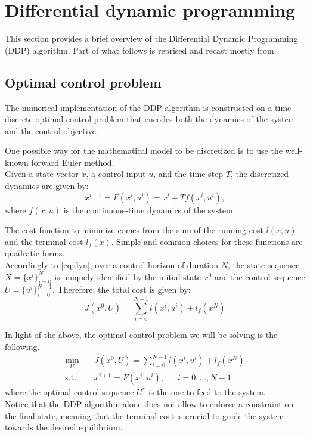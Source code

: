 \section{Differential dynamic programming}
This section provides a brief overview of the Differential Dynamic Programming (DDP) algorithm. Part of what follows is reprised and recast mostly from \cite{tassa07}.

\subsection{Optimal control problem}
The numerical implementation of the DDP algorithm is constructed on a time-discrete optimal control problem that encodes both the dynamics of the system and the control objective.

One possible way for the mathematical model to be discretized is to use the well-known forward Euler method. \\
Given a state vector $x$, a control input $u$, and the time step $T$, the discretized dynamics are given by:
\begin{equation}
    x^{i+1} = F(x^i, u^i) = x^i + T f(x^i, u^i), \label{eq:dyn}
\end{equation}
where $f(x, u)$ is the continuous-time dynamics of the system.

The cost function to minimize comes from the sum of the running cost $l(x, u)$ and the terminal cost $l_f(x)$. Simple and common choices for these functions are quadratic forms.\\
Accordingly to \ref{eq:dyn}, over a control horizon of duration $N$, the state sequence $X = {\{x^i\}_{i=0}^{N}}$ is uniquely identified by the initial state $x^0$ and the control sequence $U = {\{u^i\}_{i=0}^{N-1}}$. Therefore, the total cost is given by:
\begin{equation}
    J(x^0, U) = \sum_{i=0}^{N-1} l(x^i, u^i) + l_f(x^N) \label{eq:cost}
\end{equation}

In light of the above, the optimal control problem we will be solving is the following.
\begin{equation*}
    \begin{aligned}
        \min_U & \quad J(x^0, U) = \sum_{i=0}^{N-1} l(x^i, u^i) + l_f(x^N) \\
        \text{s.t.} & \quad x^{i+1} = F(x^i, u^i), \quad \;\; i = 0, \ldots, N-1
    \end{aligned}
\end{equation*}
where the optimal control sequence $U^*$ is the one to feed to the system.\\
Notice that the DDP algorithm alone does not allow to enforce a constraint on the final state, meaning that the terminal cost is crucial to guide the system towards the desired equilibrium.

